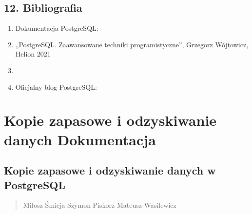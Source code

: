 \documentclass[letterpaper,10pt,polish]{sphinxmanual}
\begin{document}
\subsection{12. Bibliografia}
\label{\detokenize{rozdzial2/Partycjonowanie-danych/rozdzia_u0142 1/index:bibliografia}}\begin{enumerate}
%
\item {} 
\sphinxAtStartPar
Dokumentacja PostgreSQL: 

\item {} 
\sphinxAtStartPar
„PostgreSQL. Zaawansowane techniki programistyczne”, Grzegorz Wójtowicz, Helion 2021

\item {} 
\sphinxAtStartPar
{}

\item {} 
\sphinxAtStartPar
Oficjalny blog PostgreSQL: 

\end{enumerate}

\sphinxstepscope


\section{Kopie zapasowe i odzyskiwanie danych \sphinxhyphen{} Dokumentacja}
\label{\detokenize{rozdzial2/Kopie_zapasowe_i_odzyskiwanie_danych/index:kopie-zapasowe-i-odzyskiwanie-danych-dokumentacja}}\label{\detokenize{rozdzial2/Kopie_zapasowe_i_odzyskiwanie_danych/index::doc}}
\sphinxstepscope


\subsection{Kopie zapasowe i odzyskiwanie danych w PostgreSQL}
\label{\detokenize{rozdzial2/Kopie_zapasowe_i_odzyskiwanie_danych/kopie_zapasowe_i_odzyskiwanie_danych:kopie-zapasowe-i-odzyskiwanie-danych-w-postgresql}}\label{\detokenize{rozdzial2/Kopie_zapasowe_i_odzyskiwanie_danych/kopie_zapasowe_i_odzyskiwanie_danych::doc}}\begin{quote}\begin{description}
\sphinxAtStartPar
Miłosz Śmieja Szymon Piskorz Mateusz Wasilewicz

\end{description}\end{quote}
\end{document}
